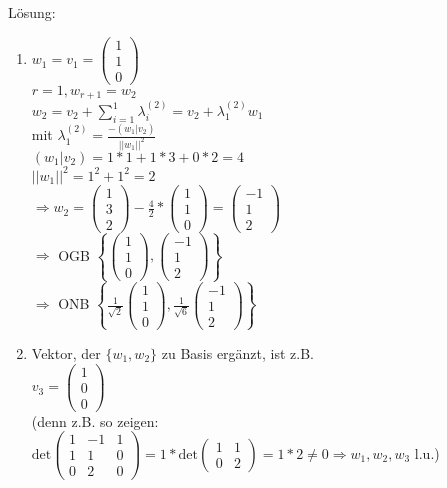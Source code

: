 Lösung:
\begin{enumerate}
\item
$w_1=v_1=\begin{pmatrix}1 \\ 1 \\ 0\end{pmatrix}$\\
$r=1, w_{r+1}=w_2$\\
$w_2=v_2+\sum_{i=1}^1 \lambda_i^{(2)} = v_2+\lambda_1^{(2)}w_1$\\
mit $\lambda_1^{(2)} = \frac{-(w_1|v_2)}{||w_1||^2}$\\
$(w_1|v_2)=1*1+1*3+0*2=4$\\
$||w_1||^2=1^2+1^2=2$\\
$\Rightarrow w_2=\begin{pmatrix}1 \\ 3 \\ 2\end{pmatrix}-\frac{4}{2}*\begin{pmatrix}1 \\ 1 \\ 0\end{pmatrix}=\begin{pmatrix}-1 \\ 1 \\ 2\end{pmatrix}$\\
$\Rightarrow$ OGB $\left\lbrace \begin{pmatrix}1 \\ 1 \\ 0\end{pmatrix},\begin{pmatrix}-1 \\ 1 \\ 2\end{pmatrix}\right\rbrace$\\
$\Rightarrow$ ONB $\left\lbrace \frac{1}{\sqrt{2}}\begin{pmatrix}1 \\ 1 \\ 0\end{pmatrix}, \frac{1}{\sqrt{6}}\begin{pmatrix}-1 \\ 1 \\ 2\end{pmatrix}\right\rbrace$

\item
Vektor, der $\lbrace w_1,w_2\rbrace$ zu Basis ergänzt, ist z.B.\\
$v_3=\begin{pmatrix}1 \\ 0 \\ 0\end{pmatrix}$\\
(denn z.B. so zeigen: $\mathrm{det}\begin{pmatrix}1 & -1 & 1 \\ 1 & 1 & 0 \\ 0 & 2 & 0\end{pmatrix}=1*\mathrm{det}\begin{pmatrix}1 & 1 \\ 0 & 2\end{pmatrix}=1*2\neq 0 \Rightarrow w_1,w_2,w_3$ l.u.)


\end{enumerate}
